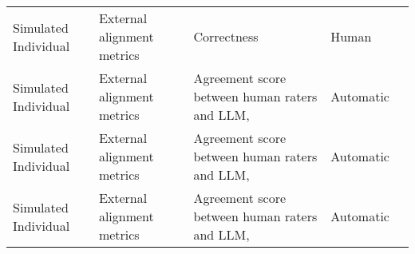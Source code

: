 \begin{small}
\begin{center}
\begin{longtable}{@{}p{}p{}p{}p{}p{}@{}}
Simulated Individual     & External alignment metrics          & Correctness                                                                                                                                                                                                 & Human     & \cite{milivcka2024large}                                                                                                                                                                                                                                                                                                                                                            \\
Simulated Individual     & External alignment metrics          & Agreement score between human raters and LLM,                                                                                                                                                               & Automatic & \cite{liu2023improvinginterpersonalcommunicationsimulating}                                                                                                                                                                                                                                                                                                                                                                                              \\
Simulated Individual     & External alignment metrics          & Agreement score between human raters and LLM,                                                                                                                                                               & Automatic & \cite{NEURIPS2023_21f7b745}                                                                                                                                                                                                                                                                                                                    \\
Simulated Individual     & External alignment metrics          & Agreement score between human raters and LLM,                                                                                                                                                               & Automatic & \cite{liu2024roleagent}                                                                                                                                                                                                                                                                                                                                                                                           \\

\end{longtable}
\end{center}
\end{small}
